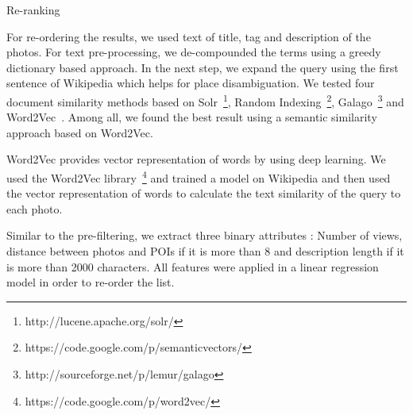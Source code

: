 \begin{subsection}{Re-ranking}

For re-ordering the results, we used text of title, tag and description of the photos. For text pre-processing, we de-compounded the terms using a greedy dictionary based approach. In the next step, we expand the query using the first sentence of Wikipedia which helps for place disambiguation. We tested four document similarity methods based on Solr~\footnote{http://lucene.apache.org/solr/}, Random Indexing~\footnote{https://code.google.com/p/semanticvectors/}, Galago~\footnote{http://sourceforge.net/p/lemur/galago} and Word2Vec~\cite{word2vec}. Among all, we found the best result using a semantic similarity approach based on Word2Vec.

Word2Vec provides vector representation of words by using deep learning. We used the Word2Vec library~\footnote{https://code.google.com/p/word2vec/} and trained a model on Wikipedia and then used the vector representation of words to calculate the text similarity of the query to each photo.

Similar to the pre-filtering, we extract three binary attributes : Number of views, distance between photos and POIs if it is more than 8 and description length if it is more than 2000 characters. All features were applied in a linear regression model in order to re-order the list.

\end{subsection}



